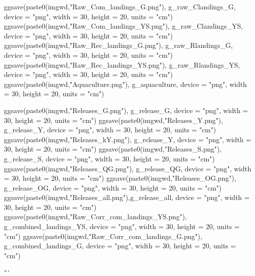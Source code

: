 ggsave(paste0(imgwd,"Raw_Com_landings_G.png"), g_raw_Clandings_G, device = "png", width = 30, height = 20, 
		units = "cm")
ggsave(paste0(imgwd,"Raw_Com_landings_YS.png"), g_raw_Clandings_YS, device = "png", width = 30, height = 20, 
		units = "cm")
ggsave(paste0(imgwd,"Raw_Rec_landings_G.png"), g_raw_Rlandings_G, device = "png", width = 30, height = 20,  
		units = "cm")
ggsave(paste0(imgwd,"Raw_Rec_landings_YS.png"), g_raw_Rlandings_YS, device = "png", width = 30, height = 20,  
		units = "cm")
ggsave(paste0(imgwd,"Aquaculture.png"), g_aquaculture, device = "png", width = 30, height = 20,
		units = "cm")

ggsave(paste0(imgwd,"Releases_G.png"), g_release_G, device = "png", width = 30, height = 20,  
		units = "cm")
ggsave(paste0(imgwd,"Releases_Y.png"), g_release_Y, device = "png", width = 30, height = 20,  
		units = "cm")
ggsave(paste0(imgwd,"Releases_kY.png"), g_release_Y, device = "png", width = 30, height = 20,  
		units = "cm")
ggsave(paste0(imgwd,"Releases_S.png"), g_release_S, device = "png", width = 30, height = 20,  
		units = "cm")
ggsave(paste0(imgwd,"Releases_QG.png"), g_release_QG, device = "png", width = 30, height = 20, 
		units = "cm")
ggsave(paste0(imgwd,"Releases_OG.png"), g_release_OG, device = "png", width = 30, height = 20, 
		units = "cm")
ggsave(paste0(imgwd,"Releases_all.png"),g_release_all, device = "png", width = 30, height = 20, 
		units = "cm")
ggsave(paste0(imgwd,"Raw_Corr_com_landings_YS.png"), g_combined_landings_YS, device = "png", width = 30, height = 20, 
		units = "cm")
ggsave(paste0(imgwd,"Raw_Corr_com_landings_G.png"), g_combined_landings_G, device = "png", width = 30, height = 20, 
		units = "cm")


```
